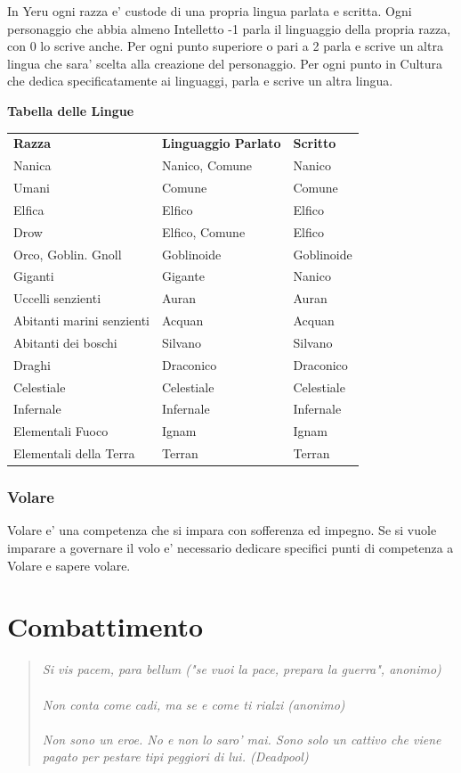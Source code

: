 \documentclass[a4paper,11pt,twoside,openany]{book}
\begin{document}
\label{linguaggi}

In Yeru ogni razza e' custode di una propria lingua parlata e scritta. Ogni personaggio che abbia almeno Intelletto -1 parla il linguaggio della propria razza, con 0 lo scrive anche. 
Per ogni punto superiore o pari a 2 parla e scrive un altra lingua che sara' scelta alla creazione del personaggio.
Per ogni punto in Cultura che dedica specificatamente ai linguaggi, parla e scrive un altra lingua.

\bigskip

\textbf{Tabella delle Lingue}

\medskip

\begin{tabular}{lll}
\toprule
\textbf{Razza} & \textbf{Linguaggio Parlato}& \textbf{Scritto}\tabularnewline
Nanica & Nanico, Comune & Nanico\tabularnewline
Umani & Comune & Comune\tabularnewline
Elfica & Elfico & Elfico\tabularnewline
Drow & Elfico, Comune & Elfico\tabularnewline
Orco, Goblin. Gnoll & Goblinoide & Goblinoide\tabularnewline
Giganti & Gigante & Nanico\tabularnewline
Uccelli senzienti & Auran & Auran\tabularnewline
Abitanti marini senzienti & Acquan & Acquan\tabularnewline
Abitanti dei boschi & Silvano & Silvano\tabularnewline
Draghi & Draconico & Draconico\tabularnewline
Celestiale & Celestiale & Celestiale\tabularnewline
Infernale & Infernale & Infernale\tabularnewline
Elementali Fuoco & Ignam & Ignam\tabularnewline
Elementali della Terra & Terran & Terran\tabularnewline

\end{tabular}

\subsubsection{Volare}

\label{volare}

Volare e' una competenza che si impara con sofferenza ed impegno. Se si vuole imparare a governare il volo e' necessario dedicare specifici punti di competenza a Volare e sapere volare.

\pagebreak

\section{Combattimento}

\label{combattimento}
\begin{quote}\textit{
Si vis pacem, para bellum ("se vuoi la pace, prepara la guerra", anonimo)\\\\
Non conta come cadi, ma se e come ti rialzi (anonimo)\\\\
Non sono un eroe. No e non lo saro' mai. Sono solo un cattivo che viene pagato per pestare tipi peggiori di lui. (Deadpool)
}\end{quote}
\end{document}
